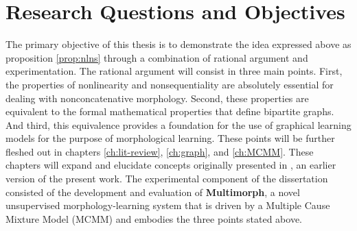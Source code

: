

\section{Research Questions and Objectives}
The primary objective of this thesis is to demonstrate the idea expressed above as proposition \ref{prop:nlns} through a combination of rational argument and experimentation.
The rational argument will consist in three main points.
First, the properties of nonlinearity and nonsequentiality are absolutely essential for dealing with nonconcatenative morphology.
Second, these properties are equivalent to the formal mathematical properties that define bipartite graphs. And third, this equivalence provides a foundation for the use of graphical learning models for the purpose of morphological learning. 
These points will be further fleshed out in chapters \ref{ch:lit-review}, \ref{ch:graph}, and \ref{ch:MCMM}. These chapters will expand and elucidate concepts originally presented in \citet{meyer-and-dickinson:2016}, an earlier version of the present work.
The experimental component of the dissertation consisted of the development and evaluation of
 \textbf{Multimorph}, a novel unsupervised morphology-learning system that is driven by a Multiple Cause Mixture Model (MCMM) \citep{saund:94} and embodies the three points stated above. 
	
